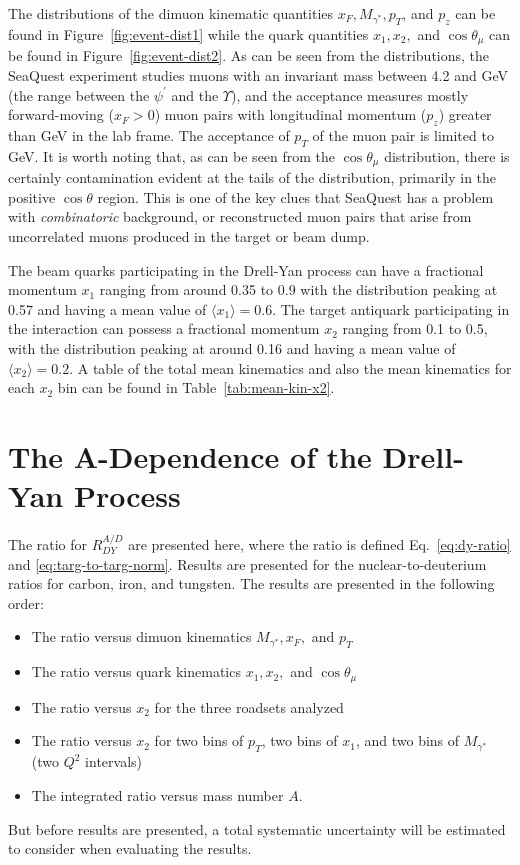 The distributions of the dimuon kinematic quantities $x_F, M_{\gamma^*}, p_T$, and $p_z$ can be found in Figure~\ref{fig:event-dist1} while the quark quantities $x_1, x_2,$ and $\cos\theta_\mu$ can be found in Figure~\ref{fig:event-dist2}. As can be seen from the distributions, the SeaQuest experiment studies muons with an invariant mass between 4.2 and \unit[10]{GeV} (the range between the $\psi^\prime$ and the $\Upsilon$), and the acceptance measures mostly forward-moving ($x_F>0$) muon pairs with longitudinal momentum ($p_z$) greater than \unit[40]{GeV} in the lab frame. The acceptance of $p_T$ of the muon pair is limited to \unit[3]{GeV}. It is worth noting that, as can be seen from the $\cos\theta_\mu$ distribution, there is certainly contamination evident at the tails of the distribution, primarily in the positive $\cos\theta$ region. This is one of the key clues that SeaQuest has a problem with \emph{combinatoric} background, or reconstructed muon pairs that arise from uncorrelated muons produced in the target or beam dump.

The beam quarks participating in the Drell-Yan process can have a fractional momentum $x_1$ ranging from around 0.35 to 0.9 with the distribution peaking at 0.57 and having a mean value of $\langle x_1 \rangle = 0.6$. The target antiquark participating in the interaction can possess a fractional momentum $x_2$ ranging from 0.1 to 0.5, with the distribution peaking at around 0.16 and having a mean value of $\langle x_2 \rangle = 0.2$. A table of the total mean kinematics and also the mean kinematics for each $x_2$ bin can be found in Table~\ref{tab:mean-kin-x2}.




\section{The A-Dependence of the Drell-Yan Process}

The ratio for $R_{DY}^{A/D}$ are presented here, where the ratio is defined Eq.~\ref{eq:dy-ratio} and \ref{eq:targ-to-targ-norm}. Results are presented for the nuclear-to-deuterium ratios for carbon, iron, and tungsten. The results are presented in the following order:
\begin{itemize}
	\item The ratio versus dimuon kinematics $M_{\gamma^*}, x_F,$ and $p_T$
	\item The ratio versus quark kinematics $x_1, x_2,$ and $\cos\theta_\mu$
	\item The ratio versus $x_2$ for the three roadsets analyzed
	\item The ratio versus $x_2$ for two bins of $p_T$, two bins of $x_1$, and two bins of $M_{\gamma^*}$ (two $Q^2$ intervals)
	\item The integrated ratio versus mass number $A$.
\end{itemize}
But before results are presented, a total systematic uncertainty will be estimated to consider when evaluating the results.

